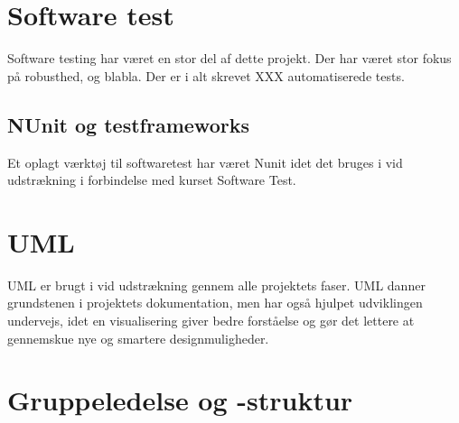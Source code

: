 \section{Software test}
Software testing har været en stor del af dette projekt. Der har været stor fokus på robusthed, og blabla. Der er i alt skrevet XXX automatiserede tests.

\subsection{NUnit og testframeworks}
Et oplagt værktøj til softwaretest har været Nunit idet det bruges i vid udstrækning i forbindelse med kurset Software Test.

\section{UML}
UML er brugt i vid udstrækning gennem alle projektets faser. UML danner grundstenen i projektets dokumentation, men har også hjulpet udviklingen undervejs, idet en visualisering giver bedre forståelse og gør det lettere at gennemskue nye og smartere designmuligheder.

\section{Gruppeledelse og -struktur}